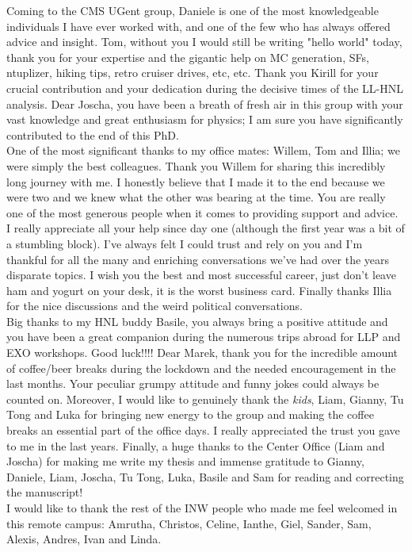 \begin{acknowledgements}
{Coming to the CMS UGent group, Daniele is one of the most knowledgeable individuals I have ever worked with, and one of the few who has always offered advice and insight.
Tom, without you I would still be writing "hello world" today, thank you for your expertise and the gigantic help on MC generation, SFs, ntuplizer, hiking tips, retro cruiser drives, etc, etc.
Thank you Kirill for your crucial contribution and your dedication during the decisive times of the LL-HNL analysis. 
Dear Joscha, you have been a breath of fresh air in this group with your vast knowledge and great enthusiasm for physics; I am sure you have significantly contributed to the end of this PhD. \\
One of the most significant thanks to my office mates: Willem, Tom and Illia; we were simply the best colleagues. Thank you Willem for sharing this incredibly long journey with me. I honestly believe that I made it to the end because we were two and we knew what the other was bearing at the time. You are really one of the most generous people when it comes to providing support and advice. I really appreciate all your help since day one (although the first year was a bit of a stumbling block). I've always felt I could trust and rely on you and I'm thankful for all the many and enriching conversations we've had over the years disparate topics. I wish you the best and most successful career, just don't leave ham and yogurt on your desk, it is the worst business card. Finally thanks Illia for the nice discussions and the weird political conversations.\\
Big thanks to my HNL buddy Basile, you always bring a positive attitude and you have been a great companion during the numerous trips abroad for LLP and EXO workshops. Good luck!!!! Dear Marek, thank you for the incredible amount of coffee/beer breaks during the lockdown and the needed encouragement in the last months. Your peculiar grumpy attitude and funny jokes could always be counted on.  
Moreover, I would like to genuinely thank the \emph{kids}, Liam, Gianny, Tu Tong and Luka for bringing new energy to the group and making the coffee breaks an essential part of the office days. I really appreciated the trust you gave to me in the last years. 
Finally, a huge thanks to the Center Office (Liam and Joscha) for making me write my thesis and immense gratitude to Gianny, Daniele, Liam, Joscha, Tu Tong, Luka, Basile and Sam for reading and correcting the manuscript! \\
I would like to thank the rest of the INW people who made me feel welcomed in this remote campus: Amrutha, Christos, Celine, Ianthe, Giel, Sander, Sam, Alexis, Andres, Ivan and Linda. \\

}
\end{acknowledgements}
